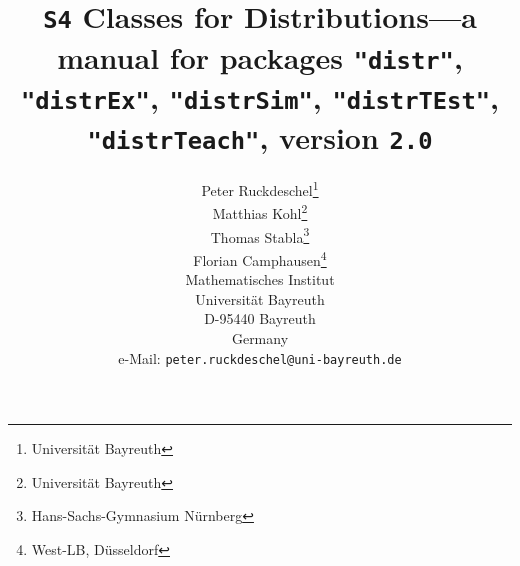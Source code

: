 \documentclass[11pt]{article}
\newcommand{\pkg}[1]{{\tt "#1"}}
\newcommand{\pkgversion}{{\tt 2.0}}
\newcommand{\pkgExversion}{{\tt 2.0}}
\begin{document}
\title{{\tt S4} Classes for Distributions---a manual for packages \pkg{distr}, 
        \pkg{distrEx}, \pkg{distrSim}, \pkg{distrTEst}, \pkg{distrTeach}, 
        version \pkgversion}
\author{\small Peter Ruckdeschel\thanks{Universit\"at Bayreuth}
\\[-.5ex]
\small Matthias Kohl\thanks{Universit\"at Bayreuth}
\\[-.5ex]
\small Thomas Stabla\thanks{Hans-Sachs-Gymnasium N\"urnberg}
\\[-.5ex]
\small Florian Camphausen\thanks{West-LB, D\"usseldorf}
\smallskip\\
\small Mathematisches Institut\\[-.5ex]
\small Universit\"at Bayreuth\\[-.5ex]
\small D-95440 Bayreuth\\[-.5ex]
\small Germany\\
\small e-Mail: {\small \tt peter.ruckdeschel@uni-bayreuth.de}\\
}
\maketitle
\end{document}
